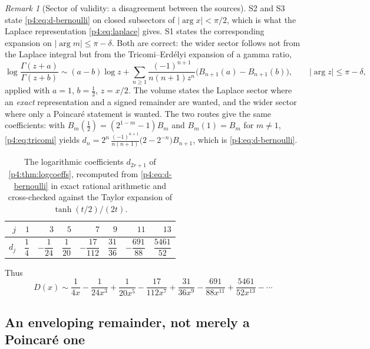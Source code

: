 \documentclass[11pt,a4paper,oneside]{book}
\theoremstyle{plain}
\theoremstyle{definition}
\theoremstyle{remark}
\newtheorem{remark}[theorem]{Remark}
\begin{document}
\begin{remark}[Sector of validity: a disagreement between the sources]
\label{p4:rem:sector}
\textsf{S2} and \textsf{S3} state \cref{p4:eq:d-bernoulli} on closed
subsectors of $|\arg x|<\pi/2$, which is what the Laplace representation
\cref{p4:eq:laplace} gives.  \textsf{S1} states the corresponding expansion on
$|\arg m|\le\pi-\delta$.  Both are correct: the wider sector follows not from
the Laplace integral but from the Tricomi--Erd\'elyi expansion of a gamma
ratio,
\begin{equation}
  \log\frac{\Gamma(z+a)}{\Gamma(z+b)}
  \sim(a-b)\log z+\sum_{n\ge1}\frac{(-1)^{n+1}}{n(n+1)z^{n}}
     \bigl(B_{n+1}(a)-B_{n+1}(b)\bigr),
  \qquad |\arg z|\le\pi-\delta,
  \label{p4:eq:tricomi}
\end{equation}
applied with $a=1$, $b=\tfrac12$, $z=x/2$.  The volume states the Laplace
sector where an \emph{exact} representation and a signed remainder are wanted,
and the wider sector where only a Poincar\'e statement is wanted.  The two
routes give the same coefficients: with $B_m(\tfrac12)=(2^{1-m}-1)B_m$ and
$B_m(1)=B_m$ for $m\ne1$, \cref{p4:eq:tricomi} yields
$d_n=2^{n}\,\frac{(-1)^{n+1}}{n(n+1)}\bigl(2-2^{-n}\bigr)B_{n+1}$, which is
\cref{p4:eq:d-bernoulli}.
\end{remark}

\begin{table}[htbp]
\centering
\caption{The logarithmic coefficients $d_{2r+1}$ of \cref{p4:thm:logcoeffs},
recomputed from \cref{p4:eq:d-bernoulli} in exact rational arithmetic and
cross-checked against the Taylor expansion of $\tanh(t/2)/(2t)$.}
\label{p4:tab:d}
\small
\begin{tabular}{@{}rrrrrrrr@{}}
\toprule
$j$ & $1$ & $3$ & $5$ & $7$ & $9$ & $11$ & $13$\\
\midrule
$d_j$ & $\dfrac14$ & $-\dfrac1{24}$ & $\dfrac1{20}$ & $-\dfrac{17}{112}$
      & $\dfrac{31}{36}$ & $-\dfrac{691}{88}$ & $\dfrac{5461}{52}$\\
\bottomrule
\end{tabular}
\end{table}

Thus
\begin{equation}
  D(x)\sim\frac1{4x}-\frac1{24x^{3}}+\frac1{20x^{5}}
  -\frac{17}{112x^{7}}+\frac{31}{36x^{9}}
  -\frac{691}{88x^{11}}+\frac{5461}{52x^{13}}-\cdots
  \label{p4:eq:D-first}
\end{equation}

\subsection{An enveloping remainder, not merely a Poincar\'e one}
\end{document}
